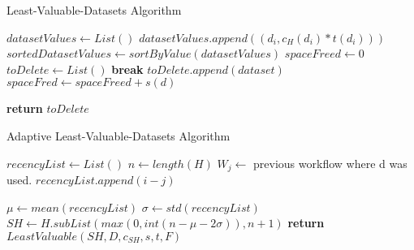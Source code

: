 \begin{algorithm}
\begin{singlespace}
\caption{Least-Valuable-Datasets Algorithm}
\label{alg:most_commonly_used_decision}
\begin{algorithmic}[1]
	\State $datasetValues \gets List()$
		\State $datasetValues.append((d_i, c_H(d_i) * t(d_i)))$
	\EndFor
	\State $sortedDatasetValues \gets sortByValue(datasetValues)$
	\State $spaceFreed \gets 0$
	\State $toDelete \gets List()$
			\State \textbf{break}
		\EndIf	
		\State $toDelete.append(dataset)$
		\State $spaceFred \gets spaceFreed + s(d)$
	\EndFor
	
	\State \textbf{return} $toDelete$
\EndProcedure
\end{algorithmic}
\end{singlespace}
\end{algorithm}


\begin{algorithm}
\begin{singlespace}
\caption{Adaptive Least-Valuable-Datasets Algorithm}
\label{alg:adaptive_most_commonly_used_decision}
\begin{algorithmic}[1]
	\State $recencyList \gets List()$
	\State $n \gets length(H)$
			\State $W_j \gets$ previous workflow where d was used.
				\State $recencyList.append(i - j)$
			\EndIf
		\EndFor
			
	\EndFor
	\State $\mu \gets mean(recencyList)$
	\State $\sigma \gets std(recencyList)$
	\State $SH \gets H.subList(max(0, int(n - \mu - 2\sigma)), n + 1)$
	\State \textbf{return} $LeastValuable(SH, D, c_{SH}, s, t, F)$

\EndProcedure
\end{algorithmic}
\end{singlespace}
\end{algorithm}

